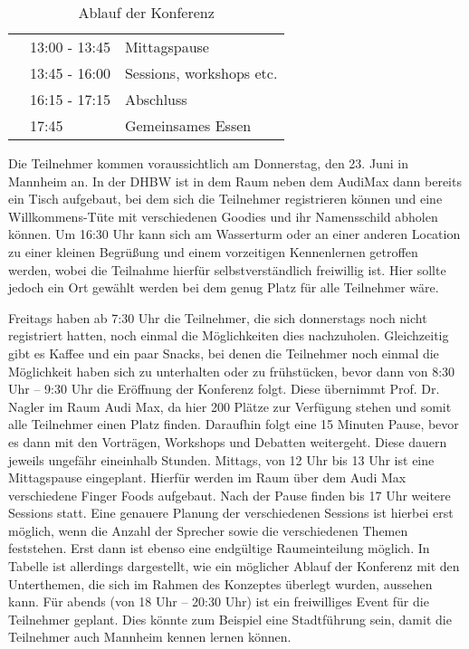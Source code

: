 \begin{table}[h]
\begin{tabular}{|l|l|l|}
			& 13:00 - 13:45 & Mittagspause                                                                                          \\ \cline{2-3} 
			& 13:45 - 16:00 & Sessions, workshops etc.                                                                              \\ \cline{2-3} 
			& 16:15 - 17:15 & Abschluss                                                                                             \\ \cline{2-3} 
			& 17:45         & Gemeinsames Essen                                                                                     \\ \hline
		\end{tabular}%
	\caption{Ablauf der Konferenz}
	\label{tab:konferenzablauf}
\end{table}
Die Teilnehmer kommen voraussichtlich am Donnerstag, den 23. Juni in Mannheim an. In der DHBW ist in dem Raum neben dem AudiMax dann bereits ein Tisch aufgebaut, bei dem sich die Teilnehmer registrieren können und eine Willkommens-Tüte mit verschiedenen Goodies und ihr Namensschild abholen können. Um 16:30 Uhr kann sich am Wasserturm oder an einer anderen Location zu einer kleinen Begrüßung und einem vorzeitigen Kennenlernen getroffen werden, wobei die Teilnahme hierfür selbstverständlich freiwillig ist. Hier sollte jedoch ein Ort gewählt werden bei dem genug Platz für alle Teilnehmer wäre.

Freitags haben ab 7:30 Uhr die Teilnehmer, die sich donnerstags noch nicht registriert hatten, noch einmal die Möglichkeiten dies nachzuholen. Gleichzeitig gibt es Kaffee und ein paar Snacks, bei denen die Teilnehmer noch einmal die Möglichkeit haben sich zu unterhalten oder zu frühstücken, bevor dann von 8:30 Uhr – 9:30 Uhr die Eröffnung der Konferenz folgt. Diese übernimmt Prof. Dr. Nagler im Raum Audi Max, da hier 200 Plätze zur Verfügung stehen und somit alle Teilnehmer einen Platz finden. Daraufhin folgt eine 15 Minuten Pause, bevor es dann mit den Vorträgen, Workshops und Debatten weitergeht. Diese dauern jeweils ungefähr eineinhalb Stunden. Mittags, von 12 Uhr bis 13 Uhr ist eine Mittagspause eingeplant. Hierfür werden im Raum über dem Audi Max verschiedene Finger Foods aufgebaut. Nach der Pause finden bis 17 Uhr weitere Sessions statt. Eine genauere Planung der verschiedenen Sessions ist hierbei erst möglich, wenn die Anzahl der Sprecher sowie die verschiedenen Themen feststehen. Erst dann ist ebenso eine endgültige Raumeinteilung möglich. In Tabelle %
ist allerdings dargestellt, wie ein möglicher Ablauf der Konferenz mit den Unterthemen, die sich im Rahmen des Konzeptes überlegt wurden, aussehen kann. Für abends (von 18 Uhr – 20:30 Uhr) ist ein freiwilliges Event für die Teilnehmer geplant. Dies könnte zum Beispiel eine Stadtführung sein, damit die Teilnehmer auch Mannheim kennen lernen können.
 

